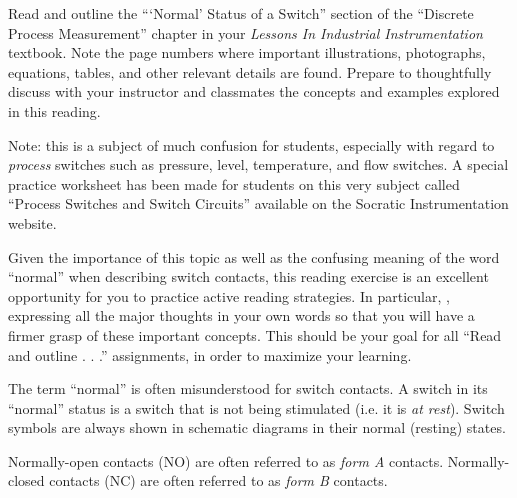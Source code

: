

Read and outline the ```Normal' Status of a Switch'' section of the ``Discrete Process Measurement'' chapter in your {\it Lessons In Industrial Instrumentation} textbook.  Note the page numbers where important illustrations, photographs, equations, tables, and other relevant details are found.  Prepare to thoughtfully discuss with your instructor and classmates the concepts and examples explored in this reading.

\vskip 30pt

Note: this is a subject of much confusion for students, especially with regard to {\it process} switches such as pressure, level, temperature, and flow switches.  A special practice worksheet has been made for students on this very subject called ``Process Switches and Switch Circuits'' available on the Socratic Instrumentation website.

Given the importance of this topic as well as the confusing meaning of the word ``normal'' when describing switch contacts, this reading exercise is an excellent opportunity for you to practice active reading strategies.  In particular, , expressing all the major thoughts in your own words so that you will have a firmer grasp of these important concepts.  This should be your goal for all ``Read and outline . . .'' assignments, in order to maximize your learning.














The term ``normal'' is often misunderstood for switch contacts.  A switch in its ``normal'' status is a switch that is not being stimulated (i.e. it is {\it at rest}).  Switch symbols are always shown in schematic diagrams in their normal (resting) states.

Normally-open contacts (NO) are often referred to as {\it form A} contacts.  Normally-closed contacts (NC) are often referred to as {\it form B} contacts.

